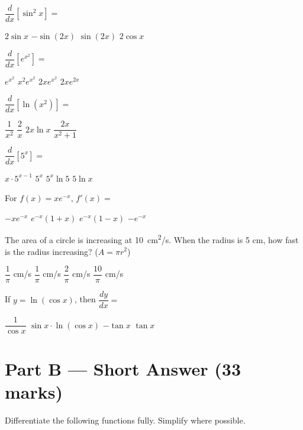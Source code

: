 \documentclass[addpoints]{exam}
\begin{document}
\begin{questions}
\question[1] $\dfrac{d}{dx}\!\left[\sin^2 x\right] = $
\begin{choices}
    \choice $2\sin x$
    \choice $-\sin(2x)$
    \correctchoice $\sin(2x)$
    \choice $2\cos x$
\end{choices}

\question[1] $\dfrac{d}{dx}\!\left[e^{x^2}\right] = $
\begin{choices}
    \choice $e^{x^2}$
    \choice $x^2 e^{x^2}$
    \correctchoice $2x e^{x^2}$
    \choice $2xe^{2x}$
\end{choices}

\question[1] $\dfrac{d}{dx}\!\left[\ln(x^2)\right] = $
\begin{choices}
    \choice $\dfrac{1}{x^2}$
    \correctchoice $\dfrac{2}{x}$
    \choice $2x\ln x$
    \choice $\dfrac{2x}{x^2+1}$
\end{choices}

\question[1] $\dfrac{d}{dx}\!\left[5^x\right] = $
\begin{choices}
    \choice $x \cdot 5^{x-1}$
    \choice $5^x$
    \correctchoice $5^x \ln 5$
    \choice $5 \ln x$
\end{choices}

\question[1] For $f(x) = xe^{-x}$, $f'(x) = $
\begin{choices}
    \choice $-xe^{-x}$
    \choice $e^{-x}(1 + x)$
    \correctchoice $e^{-x}(1 - x)$
    \choice $-e^{-x}$
\end{choices}

\question[1] The area of a circle is increasing at \SI{10}{\cm^2/s}. When the radius is
5 cm, how fast is the radius increasing? ($A = \pi r^2$)
\begin{choices}
    \choice $\dfrac{1}{\pi}$ cm/s
    \correctchoice $\dfrac{1}{\pi}$ cm/s
    \choice $\dfrac{2}{\pi}$ cm/s
    \choice $\dfrac{10}{\pi}$ cm/s
\end{choices}

\question[1] If $y = \ln(\cos x)$, then $\dfrac{dy}{dx} = $
\begin{choices}
    \choice $\dfrac{1}{\cos x}$
    \choice $\sin x \cdot \ln(\cos x)$
    \correctchoice $-\tan x$
    \choice $\tan x$
\end{choices}


\section*{Part B --- Short Answer (33 marks)}

\question Differentiate the following functions fully. Simplify where possible.
\begin{parts}

\end{parts}
\end{questions}
\end{document}
